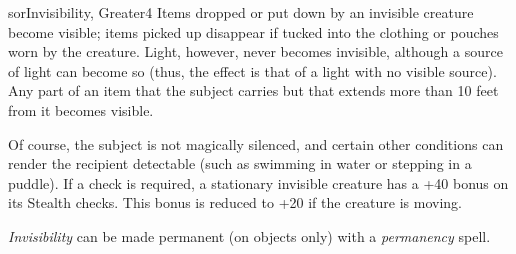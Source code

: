 \begin{spellcard}{sor}{Invisibility, Greater}{4}
  Items dropped or put down by an invisible creature become visible; items
  picked up disappear if tucked into the clothing or pouches worn by the
  creature. Light, however, never becomes invisible, although a source of
  light can become so (thus, the effect is that of a light with no visible
  source). Any part of an item that the subject carries but that extends
  more than 10 feet from it becomes visible.

  Of course, the subject is not magically silenced, and certain other
  conditions can render the recipient detectable (such as swimming in
  water or stepping in a puddle). If a check is required, a stationary
  invisible creature has a +40 bonus on its Stealth checks. This bonus is
  reduced to +20 if the creature is moving.

  \emph{Invisibility} can be made permanent (on objects only) with a
  \emph{permanency} spell.

\end{spellcard}
